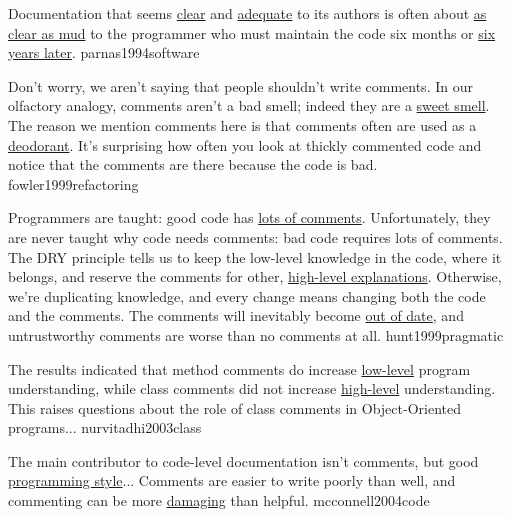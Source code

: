\documentclass{article}
\begin{document}
  {Documentation that seems \ul{clear} and \ul{adequate} to its authors is often about \ul{as clear as mud} to the programmer who must maintain the code six months or \ul{six years later}.}
  {parnas1994software}


  {Don't worry, we aren't saying that people shouldn't write comments. In our olfactory analogy, comments aren't a bad smell; indeed they are a \ul{sweet smell}. The reason we mention comments here is that comments often are used as a \ul{deodorant}. It's surprising how often you look at thickly commented code and notice that the comments are there because the code is bad.}
  {fowler1999refactoring}

  {Programmers are taught: good code has \ul{lots of comments}. Unfortunately, they are never taught why code needs comments: bad code requires lots of comments. The DRY principle tells us to keep the low-level knowledge in the code, where it belongs, and reserve the comments for other, \ul{high-level explanations}. Otherwise, we're duplicating knowledge, and every change means changing both the code and the comments. The comments will inevitably become \ul{out of date}, and untrustworthy comments are worse than no comments at all.}
  {hunt1999pragmatic}

  {The results indicated that method comments do increase \ul{low-level} program understanding, while class comments did not increase \ul{high-level} understanding. This raises questions about the role of class comments in Object-Oriented programs...}
  {nurvitadhi2003class}

  {The main contributor to code-level documentation isn't comments, but good \ul{programming style}... Comments are easier to write poorly than well, and commenting can be more \ul{damaging} than helpful.}
  {mcconnell2004code}
\end{document}
